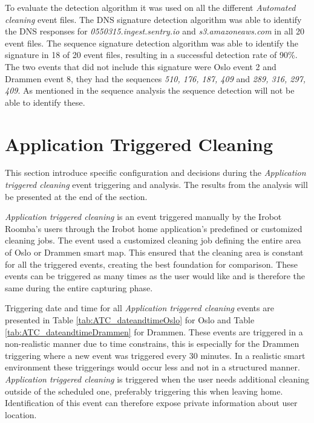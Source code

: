 To evaluate the detection algorithm it was used on all the different \textit{Automated cleaning} event files. The \gls{DNS} signature detection algorithm was able to identify the \gls{DNS} responses for \textit{0550315.ingest.sentry.io} and \textit{s3.amazoneaws.com} in all 20 event files. The sequence signature detection algorithm was able to identify the signature in 18 of 20 event files, resulting in a successful detection rate of 90\%. The two events that did not include this signature were Oslo event 2 and Drammen event 8, they had the sequences \textit{510, 176, 187, 409} and \textit{289, 316, 297, 409}. As mentioned in the sequence analysis the sequence detection will not be able to identify these.     

\section{Application Triggered Cleaning}

This section introduce specific configuration and decisions during the \textit{Application triggered cleaning} event triggering and analysis. The results from the analysis will be presented at the end of the section. 

\textit{Application triggered cleaning} is an event triggered manually by the Irobot Roomba's users through the Irobot home application's predefined or customized cleaning jobs. The event used a customized cleaning job defining the entire area of Oslo or Drammen smart map. This ensured that the cleaning area is constant for all the triggered events, creating the best foundation for comparison. These events can be triggered as many times as the user would like and is therefore the same during the entire capturing phase. 

Triggering date and time for all \textit{Application triggered cleaning} events are presented in Table \ref{tab:ATC_dateandtimeOslo} for Oslo and Table \ref{tab:ATC_dateandtimeDrammen} for Drammen. These events are triggered in a non-realistic manner due to time constrains, this is especially for the Drammen triggering where a new event was triggered every 30 minutes. In a realistic smart environment these triggerings would occur less and not in a structured manner. \textit{Application triggered cleaning} is triggered when the user needs additional cleaning outside of the scheduled one, preferably triggering this when leaving home. Identification of this event can therefore expose private information about user location. 

